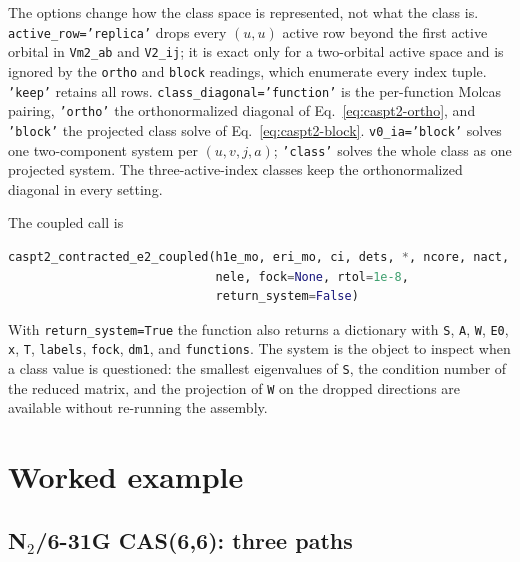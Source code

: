 {\sloppy
The options change how the class space is represented, not what the
class is.  \texttt{active\_row='replica'} drops every $(u,u)$ active row
beyond the first active orbital in \texttt{Vm2\_ab} and \texttt{V2\_ij};
it is exact only for a two-orbital active space and is ignored by the
\texttt{ortho} and \texttt{block} readings, which enumerate every index
tuple.  \texttt{'keep'} retains all rows.  \texttt{class\_diagonal='function'} is the
per-function Molcas pairing, \texttt{'ortho'} the orthonormalized
diagonal of Eq.~\eqref{eq:caspt2-ortho}, and \texttt{'block'} the
projected class solve of Eq.~\eqref{eq:caspt2-block}.
\texttt{v0\_ia='block'} solves one two-component system per
$(u,v,j,a)$; \texttt{'class'} solves the whole class as one projected
system.  The three-active-index classes keep the orthonormalized
diagonal in every setting.\par}

The coupled call is
\begin{lstlisting}[language=Python]
caspt2_contracted_e2_coupled(h1e_mo, eri_mo, ci, dets, *, ncore, nact,
                             nele, fock=None, rtol=1e-8,
                             return_system=False)
\end{lstlisting}
With \texttt{return\_system=True} the function also returns a dictionary
with \texttt{S}, \texttt{A}, \texttt{W}, \texttt{E0}, \texttt{x},
\texttt{T}, \texttt{labels}, \texttt{fock}, \texttt{dm1}, and
\texttt{functions}.  The system is the object to inspect when a class
value is questioned: the smallest eigenvalues of \texttt{S}, the
condition number of the reduced matrix, and the projection of
\texttt{W} on the dropped directions are available without re-running
the assembly.

\section{Worked example}
\label{sec:caspt2-example}

\subsection{N\texorpdfstring{$_2$}{2}/6-31G CAS(6,6): three paths}

